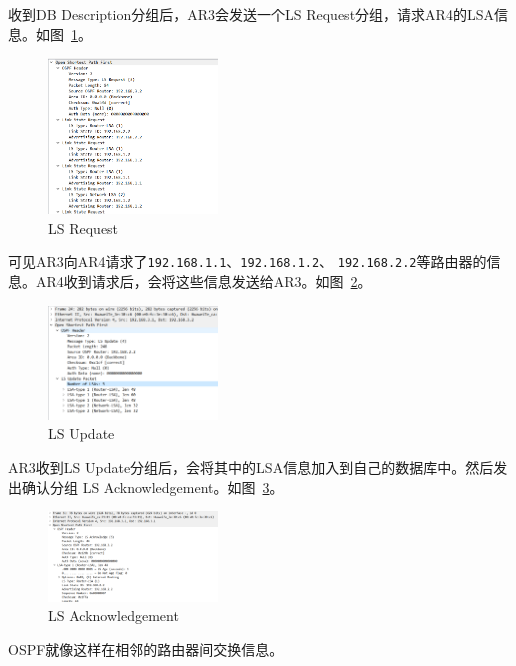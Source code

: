 \documentclass[a4paper,twoside]{article}
\begin{document}
\begin{spacing}{1.2}
收到DB Description分组后，AR3会发送一个LS Request分组，请求AR4的LSA信息。如图~\ref{fig:lsreq}。
\begin{figure}[htb]
	\centering
	\caption{LS Request}
	\label{fig:lsreq}
	\includegraphics[width=0.4\textwidth]{lsreq.png}
\end{figure}
可见AR3向AR4请求了\texttt{192.168.1.1}、\texttt{192.168.1.2}、
\texttt{192.168.2.2}等路由器的信息。AR4收到请求后，会将这些信息发送给AR3。如图~\ref{fig:lsupdate}。
\begin{figure}[htb]
	\centering
	\caption{LS Update}
	\label{fig:lsupdate}
	\includegraphics[width=0.4\textwidth]{lsresp.png}
\end{figure}
AR3收到LS Update分组后，会将其中的LSA信息加入到自己的数据库中。然后发出确认分组
LS Acknowledgement。如图~\ref{fig:lsack}。
\begin{figure}[htb]
	\centering
	\caption{LS Acknowledgement}
	\label{fig:lsack}
	\includegraphics[width=0.4\textwidth]{lsack.png}
\end{figure}
OSPF就像这样在相邻的路由器间交换信息。


\end{spacing}
\end{document}
